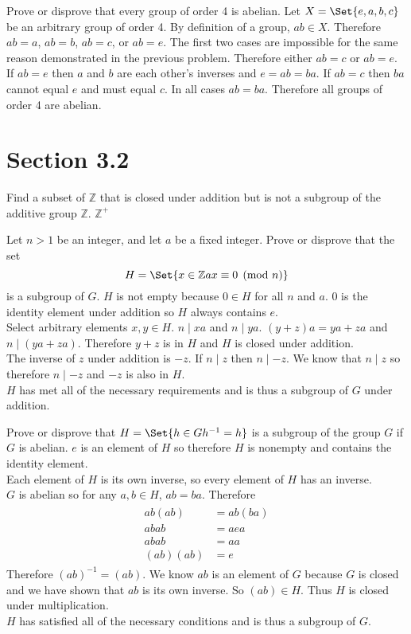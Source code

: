 \documentclass[paper=a4, fontsize=11pt]{jhwhw} %
\providecommand\given{} %
\begin{document}
Prove or disprove that every group of order 4 is abelian.
\solution
Let $X = \Set{e, a, b, c}$ be an arbitrary group of order 4. By definition of a group, $ab \in X$. Therefore $ab = a$, $ab=b$, $ab=c$, or $ab=e$. The first two cases are impossible for the same reason demonstrated in the previous problem. Therefore either $ab=c$ or $ab=e$. If $ab=e$ then $a$ and $b$ are each other's inverses and $e=ab=ba$. If $ab=c$ then $ba$ cannot equal $e$ and must equal $c$. In all cases $ab=ba$. Therefore all groups of order 4 are abelian.

\newpage
\section*{Section 3.2}
Find a subset of $\mathbb Z$ that is closed under addition but is not a subgroup of the additive group $\mathbb Z$.
\solution
$\mathbb Z^{+}$

Let $n > 1$ be an integer, and let $a$ be a fixed integer. Prove or disprove that the set
$$H = \Set{x\in \mathbb Z \given ax \equiv 0 \pmod{n}}$$
is a subgroup of $G$.
\solution
$H$ is not empty because $0\in H$ for all $n$ and $a$. $0$ is the identity element under addition so $H$ always contains $e$.\\
Select arbitrary elements $x, y\in H$. $n\mid xa$ and $n\mid ya$. $(y+z)a = ya+za$ and $n\mid (ya+za)$. Therefore $y+z$ is in $H$ and $H$ is closed under addition.\\
The inverse of $z$ under addition is $-z$. If $n\mid z$ then $n\mid -z$. We know that $n\mid z$ so therefore $n\mid -z$ and $-z$ is also in $H$.\\
$H$ has met all of the necessary requirements and is thus a subgroup of $G$ under addition.

Prove or disprove that $H = \Set{h\in G \given h^{-1} = h}$ is a subgroup of the group $G$ if $G$ is abelian.
\solution
$e$ is an element of $H$ so therefore $H$ is nonempty and contains the identity element. \\
Each element of $H$ is its own inverse, so every element of $H$ has an inverse.\\
$G$ is abelian so for any $a,b \in H$, $ab=ba$. Therefore
\begin{align}
\begin{split}
ab(ab) &= ab(ba)\\
abab &= aea\\
abab &= aa\\
(ab)(ab) &= e
\end{split}
\end{align}
Therefore $(ab)^{-1} = (ab)$. We know $ab$ is an element of $G$ because $G$ is closed and we have shown that $ab$ is its own inverse. So $(ab) \in H$. Thus $H$ is closed under multiplication.\\
$H$ has satisfied all of the necessary conditions and is thus a subgroup of $G$.
\end{document}
